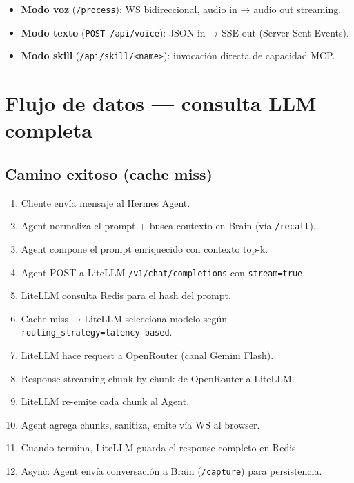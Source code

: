 \documentclass[11pt,a4paper]{article}
\begin{document}
\begin{itemize}[leftmargin=*,itemsep=1pt]
\item \textbf{Modo voz} (\texttt{/process}): WS bidireccional, audio in → audio out streaming.
\item \textbf{Modo texto} (\texttt{POST /api/voice}): JSON in → SSE out (Server-Sent Events).
\item \textbf{Modo skill} (\texttt{/api/skill/<name>}): invocación directa de capacidad MCP.
\end{itemize}

\newpage

\section{Flujo de datos — consulta LLM completa}

\subsection{Camino exitoso (cache miss)}

\begin{enumerate}[leftmargin=*,itemsep=2pt]
\item Cliente envía mensaje al Hermes Agent.
\item Agent normaliza el prompt + busca contexto en Brain (vía \texttt{/recall}).
\item Agent compone el prompt enriquecido con contexto top-k.
\item Agent POST a LiteLLM \texttt{/v1/chat/completions} con \texttt{stream=true}.
\item LiteLLM consulta Redis para el hash del prompt.
\item Cache miss → LiteLLM selecciona modelo según \texttt{routing\_strategy=latency-based}.
\item LiteLLM hace request a OpenRouter (canal Gemini Flash).
\item Response streaming chunk-by-chunk de OpenRouter a LiteLLM.
\item LiteLLM re-emite cada chunk al Agent.
\item Agent agrega chunks, sanitiza, emite vía WS al browser.
\item Cuando termina, LiteLLM guarda el response completo en Redis.
\item Async: Agent envía conversación a Brain (\texttt{/capture}) para persistencia.
\end{enumerate}
\end{document}
